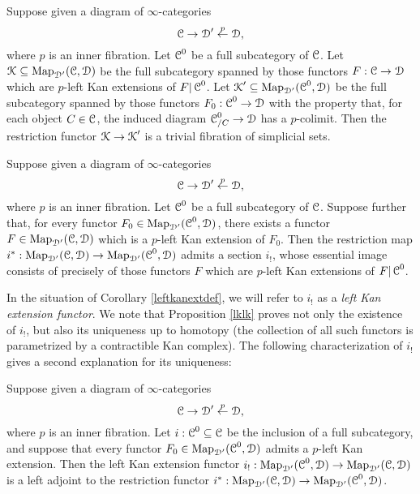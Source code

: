 \begin{proposition}\label{lklk}
Suppose given a diagram of $\infty$-categories
$$ \calC \rightarrow \calD' \stackrel{p}{\leftarrow} \calD,$$
where $p$ is an inner fibration. Let $\calC^{0}$ be a full subcategory of $\calC$.
Let $\calK \subseteq \bHom_{\calD'}(\calC, \calD)$ be the full subcategory spanned by those functors $F: \calC \rightarrow \calD$ which are $p$-left Kan extensions of $F | \calC^{0}$.
Let $\calK' \subseteq \bHom_{\calD'}(\calC^{0}, \calD)$ be the full subcategory spanned
by those functors
$F_0: \calC^{0} \rightarrow \calD$ with the property that, for each object
$C \in \calC$, the induced diagram
$ \calC^{0}_{/C} \rightarrow \calD$ has a $p$-colimit. Then the restriction functor
$\calK \rightarrow \calK'$ is a trivial fibration of simplicial sets.
\end{proposition}

\begin{corollary}\label{leftkanextdef}
Suppose given a diagram of $\infty$-categories
$$ \calC \rightarrow \calD' \stackrel{p}{\leftarrow} \calD,$$
where $p$ is an inner fibration. Let $\calC^{0}$ be a full subcategory of $\calC$.
Suppose further that, for every functor $F_0 \in \bHom_{\calD'}(\calC^{0}, \calD)$,
there exists a functor $F \in \bHom_{\calD'}(\calC,\calD)$ which is a $p$-left Kan extension
of $F_0$.
Then the restriction map $i^{\ast}: \bHom_{\calD'}(\calC,\calD) \rightarrow 
\bHom_{\calD'}(\calC^{0},\calD)$ admits a section
$i_{!}$, whose essential image consists of precisely of those functors $F$
which are $p$-left Kan extensions of $F | \calC^{0}$.
\end{corollary}

In the situation of Corollary \ref{leftkanextdef}, we will refer to $i_{!}$ as a {\it left Kan extension functor}. We note that Proposition \ref{lklk} proves not only the existence of $i_{!}$, but also its uniqueness up to homotopy (the collection of all such functors is parametrized by a contractible Kan complex). The following characterization of $i_{!}$ gives a second explanation for its uniqueness:

\begin{proposition}\label{leftkanadj}
Suppose given a diagram of $\infty$-categories
$$ \calC \rightarrow \calD' \stackrel{p}{\leftarrow} \calD,$$
where $p$ is an inner fibration. Let $i: \calC^{0} \subseteq \calC$ be the inclusion of a full subcategory,
and suppose that every functor $F_0 \in \bHom_{\calD'}(\calC^{0},\calD)$ admits a $p$-left Kan extension. Then the left Kan extension functor
$i_{!}: \bHom_{ \calD'}( \calC^{0}, \calD) \rightarrow \bHom_{\calD'}(\calC, \calD)$
is a left adjoint to the restriction functor $i^{\ast}: \bHom_{\calD'}(\calC, \calD) \rightarrow
\bHom_{\calD'}(\calC^{0}, \calD)$.
\end{proposition}

